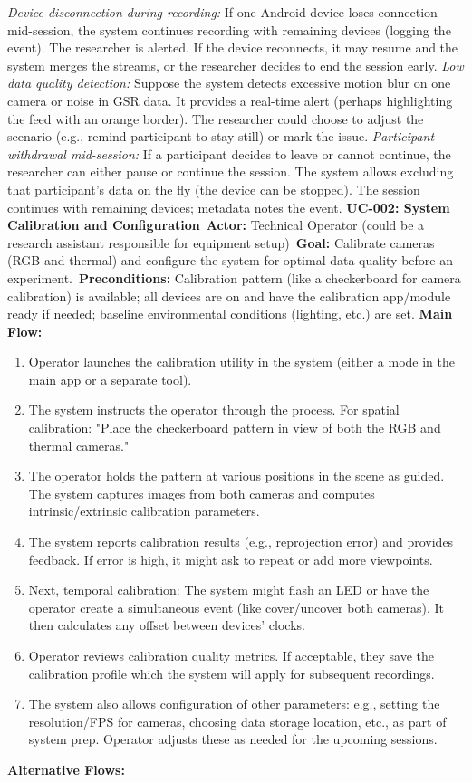 \documentclass[11pt,a4paper]{report}
\begin{document}
\textit{Device disconnection during recording:} If one Android device loses connection mid-session, the system continues recording with remaining devices (logging the event). The researcher is alerted. If the device reconnects, it may resume and the system merges the streams, or the researcher decides to end the session early.
\textit{Low data quality detection:} Suppose the system detects excessive motion blur on one camera or noise in GSR data. It provides a real-time alert (perhaps highlighting the feed with an orange border). The researcher could choose to adjust the scenario (e.g., remind participant to stay still) or mark the issue.
\textit{Participant withdrawal mid-session:} If a participant decides to leave or cannot continue, the researcher can either pause or continue the session. The system allows excluding that participant’s data on the fly (the device can be stopped). The session continues with remaining devices; metadata notes the event.
\vspace{1ex}
\noindent\textbf{UC-002: System Calibration and Configuration}\
\textbf{Actor:} Technical Operator (could be a research assistant responsible for equipment setup)\
\textbf{Goal:} Calibrate cameras (RGB and thermal) and configure the system for optimal data quality before an experiment.\
\textbf{Preconditions:} Calibration pattern (like a checkerboard for camera calibration) is available; all devices are on and have the calibration app/module ready if needed; baseline environmental conditions (lighting, etc.) are set. \textbf{Main Flow:}
\begin{enumerate}
\item Operator launches the calibration utility in the system (either a mode in the main app or a separate tool).
\item The system instructs the operator through the process. For spatial calibration: "Place the checkerboard pattern in view of both the RGB and thermal cameras."
\item The operator holds the pattern at various positions in the scene as guided. The system captures images from both cameras and computes intrinsic/extrinsic calibration parameters.
\item The system reports calibration results (e.g., reprojection error) and provides feedback. If error is high, it might ask to repeat or add more viewpoints.
\item Next, temporal calibration: The system might flash an LED or have the operator create a simultaneous event (like cover/uncover both cameras). It then calculates any offset between devices' clocks.
\item Operator reviews calibration quality metrics. If acceptable, they save the calibration profile which the system will apply for subsequent recordings.
\item The system also allows configuration of other parameters: e.g., setting the resolution/FPS for cameras, choosing data storage location, etc., as part of system prep. Operator adjusts these as needed for the upcoming sessions.
\end{enumerate} \textbf{Alternative Flows:}
\end{document}
